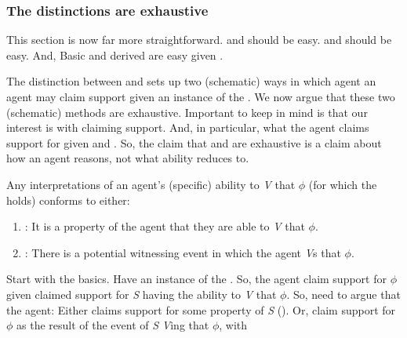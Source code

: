 \subsubsection{The distinctions are exhaustive}
\label{sec:ar-wr-are}

\begin{note}
  \color{red}
  This section is now far more straightforward.
  \dd{} and \dr{} should be easy.
  \AR{} and \WR{} should be easy.
  And, Basic and derived are easy given \AR{}.
\end{note}

\begin{note}
  The distinction between \AR{} and \WR{} sets up two (schematic) ways in which agent an agent may claim support given an instance of the \aben{}.
  We now argue that these two (schematic) methods are exhaustive.
  {
    \color{red}
    Important to keep in mind is that our interest is with claiming support.
    And, in particular, what the agent claims support for given \AR{} and \WR{}.
    So, the claim that \AR{} and \WR{} are exhaustive is a claim about how an agent reasons, not what ability reduces to.
  }
\end{note}

\begin{note}[Exhaustive]
  \begin{proposition}\label{prop:WR-and-AR-exhaustive}\label{either-AR-or-WR}
    Any interpretations of an agent's (specific) ability to \emph{V} that \(\phi\) (for which the \aben{} holds) conforms to either:
    \begin{enumerate}
    \item \AR{}: It is a property of the agent that they are able to \emph{V} that \(\phi\).
    \item \WR{}: There is a potential witnessing event in which the agent \emph{V}s that \(\phi\).
    \end{enumerate}
    \vspace{-\topsep}\vspace{-\topsep}
  \end{proposition}
\end{note}

\begin{note}[Argument]
  \color{red}
  Start with the basics.
  Have an instance of the \aben{}.
  So, the agent claim support for \(\phi\) given claimed support for \emph{S} having the ability to \emph{V} that \(\phi\).
  So, need to argue that the agent:
  Either claims support for some property of \emph{S} (\AR{}).
  Or, claim support for \(\phi\) as the result of the event of \emph{S} \emph{V}ing that \(\phi\), with 
\end{note}

